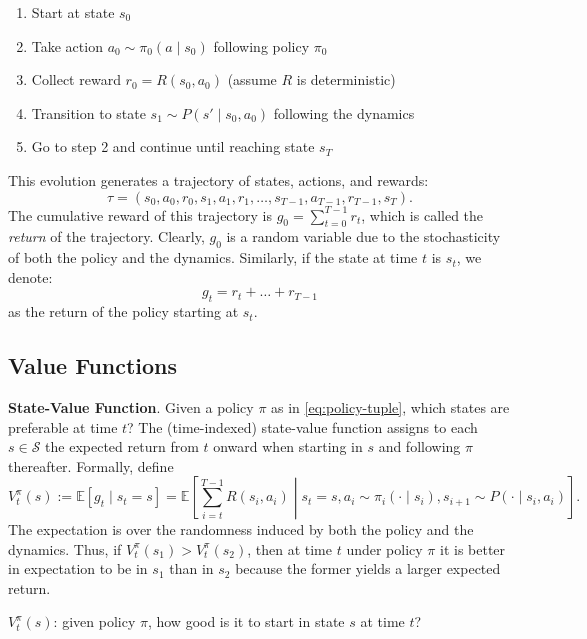 \documentclass[
]{book}
\providecommand{\tightlist}{%
  \setlength{\itemsep}{0pt}\setlength{\parskip}{0pt}}
\theoremstyle{definition}
\theoremstyle{definition}
\theoremstyle{definition}
\theoremstyle{definition}
\theoremstyle{remark}
\begin{document}
\begin{enumerate}
\def\labelenumi{\arabic{enumi}.}
\tightlist
\item
  Start at state \(s_0\)
\item
  Take action \(a_0 \sim \pi_0(a \mid s_0)\) following policy \(\pi_0\)
\item
  Collect reward \(r_0 = R(s_0, a_0)\) (assume \(R\) is deterministic)
\item
  Transition to state \(s_1 \sim P(s' \mid s_0, a_0)\) following the dynamics
\item
  Go to step 2 and continue until reaching state \(s_T\)
\end{enumerate}

This evolution generates a trajectory of states, actions, and rewards:
\[
\tau = (s_0, a_0, r_0, s_1, a_1, r_1,\dots, s_{T-1}, a_{T-1}, r_{T-1}, s_T).
\]
The cumulative reward of this trajectory is \(g_0 = \sum_{t=0}^{T-1} r_t\), which is called the \emph{return} of the trajectory. Clearly, \(g_0\) is a random variable due to the stochasticity of both the policy and the dynamics. Similarly, if the state at time \(t\) is \(s_t\), we denote:
\[
g_t = r_t + \dots + r_{T-1}
\]
as the return of the policy starting at \(s_t\).

\subsection{Value Functions}\label{FiniteHorizonMDP-Value}

\textbf{State-Value Function}. Given a policy \(\pi\) as in \eqref{eq:policy-tuple}, which states are preferable at time \(t\)? The (time-indexed) state-value function assigns to each \(s\in\mathcal{S}\) the expected return from \(t\) onward when starting in \(s\) and following \(\pi\) thereafter. Formally, define
\begin{equation}
V_t^\pi(s) := \mathbb{E} \left[g_t \mid s_t=s\right]
= \mathbb{E} \left[\sum_{i=t}^{T-1} R(s_i,a_i) \middle| s_t=s,a_i\sim \pi_i(\cdot\mid s_i), s_{i+1}\sim P(\cdot\mid s_i,a_i)\right].
\label{eq:FiniteHorizonMDP-state-value}
\end{equation}
The expectation is over the randomness induced by both the policy and the dynamics. Thus, if \(V_t^\pi(s_1)>V_t^\pi(s_2)\), then at time \(t\) under policy \(\pi\) it is better in expectation to be in \(s_1\) than in \(s_2\) because the former yields a larger expected return.

\(V^{\pi}_t(s)\): given policy \(\pi\), how good is it to start in state \(s\) at time \(t\)?
\end{document}

